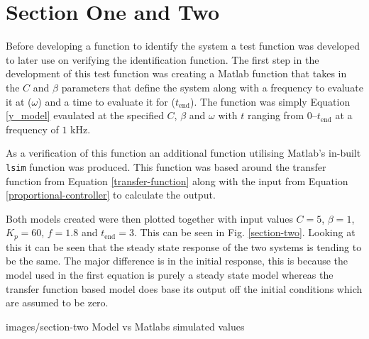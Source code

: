 \section*{Section One and Two}

Before developing a function to identify the system a test function was
developed to later use on verifying the identification function.  The first step
in the development of this test function was creating a Matlab function that
takes in the $C$ and $\beta$ parameters that define the system along with a
frequency to evaluate it at ($\omega$) and a time to evaluate it for
($t_\text{end}$).  The function was simply Equation \eqref{y_model} evaulated at
the specified $C$, $\beta$ and $\omega$ with $t$ ranging from
$0$--$t_\text{end}$ at a frequency of $1$ kHz.

As a verification of this function an additional function utilising Matlab's
in-built \texttt{lsim} function was produced.  This function was based around
the transfer function from Equation \eqref{transfer-function} along with the input
from Equation \eqref{proportional-controller} to calculate the output.

Both models created were then plotted together with input values $C = 5$, $\beta
= 1$, $K_p = 60$, $f = 1.8$ and $t_\text{end} = 3$.  This can be seen in Fig.
\ref{section-two}.  Looking at this it can be seen that the steady state response of
the two systems is tending to be the same.  The major difference is in the
initial response, this is because the model used in the first equation is purely
a steady state model whereas the transfer function based model does base its
output off the initial conditions which are assumed to be zero.

              {images/section-two}
              {Model vs Matlabs simulated values\label{section-two}}

